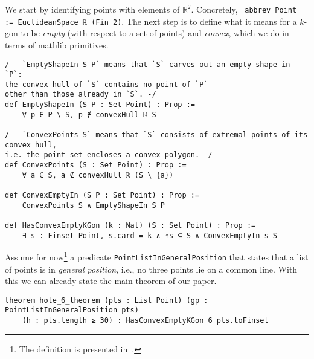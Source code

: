 We start by identifying points with elements of $\mathbb{R}^2$. Concretely, ~\lstinline|abbrev Point := EuclideanSpace ℝ (Fin 2)|.
The next step is to define what it means for a $k$-gon to be \emph{empty} (with respect to a set of points) and \emph{convex}, which we do in terms of \textsf{mathlib} primitives.

\begin{lstlisting}
/-- `EmptyShapeIn S P` means that `S` carves out an empty shape in `P`:
the convex hull of `S` contains no point of `P`
other than those already in `S`. -/
def EmptyShapeIn (S P : Set Point) : Prop :=
    ∀ p ∈ P \ S, p ∉ convexHull ℝ S

/-- `ConvexPoints S` means that `S` consists of extremal points of its convex hull,
i.e. the point set encloses a convex polygon. -/
def ConvexPoints (S : Set Point) : Prop :=
    ∀ a ∈ S, a ∉ convexHull ℝ (S \ {a})

def ConvexEmptyIn (S P : Set Point) : Prop :=
    ConvexPoints S ∧ EmptyShapeIn S P

def HasConvexEmptyKGon (k : Nat) (S : Set Point) : Prop :=
    ∃ s : Finset Point, s.card = k ∧ ↑s ⊆ S ∧ ConvexEmptyIn s S
\end{lstlisting}

Assume for now\footnote{The definition is presented in~.} a predicate \lstinline|PointListInGeneralPosition| that states that a list of points is in \emph{general position}, i.e., no three points lie on a common line.
With this we can already state the main theorem of our paper.

\begin{lstlisting}
theorem hole_6_theorem (pts : List Point) (gp : PointListInGeneralPosition pts)
    (h : pts.length ≥ 30) : HasConvexEmptyKGon 6 pts.toFinset
\end{lstlisting}

